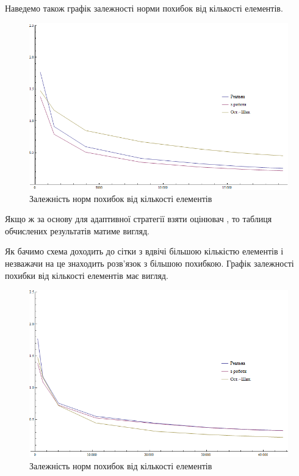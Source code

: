 Наведемо також графік залежності норми похибок від кількості елементів.

\begin{figure}[H]
	\centering
    \includegraphics[scale=0.65]{problem1/MY/Plotnb}
    \caption{Залежність норм похибок від кількості елементів}
    \label{fig:p1_my_errors}
\end{figure}

Якщо ж за основу для адаптивної стратегії взяти оцінювач , то таблиця обчислених результатів матиме вигляд.


Як бачимо схема доходить до сітки з вдвічі більшою кількістю елементів і незважачи на це знаходить розв'язок з більшою похибкою. Графік залежності похибки від кількості елементів має вигляд.


\begin{figure}[H]
	\centering
    \includegraphics[scale=0.65]{problem1/ost/Plotnb}
    \caption{Залежність норм похибок від кількості елементів}
    \label{fig:p1_ost_errors}
\end{figure}
